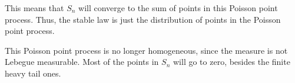 \documentclass[../main/main.tex]{subfiles}
\begin{document}
This means that $S_n$ will converge to the sum of points in this Poisson point process. Thus, the stable law is just the distribution of points in the Poisson point process.

\begin{remark}
	This Poisson point process is no longer homogeneous, since the measure is not Lebegue measurable. Most of the points in $S_n$ will go to zero, besides the finite heavy tail ones.
\end{remark}
\end{document}
